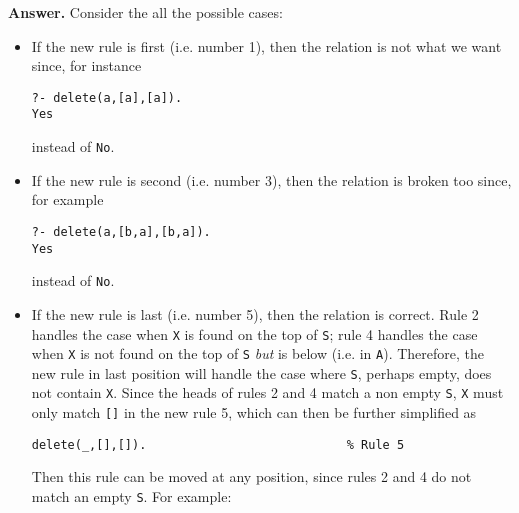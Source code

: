\noindent \textbf{Answer.} Consider the all the possible cases:
\begin{itemize}
 
  \item If the new rule is first (i.e. number 1), then the relation is
    not what we want since, for instance
{\small
\begin{verbatim}
?- delete(a,[a],[a]).
Yes
\end{verbatim}
}
\noindent instead of \texttt{No}.

  \item If the new rule is second (i.e. number 3), then the relation
    is broken too since, for example
{\small
\begin{verbatim}
?- delete(a,[b,a],[b,a]).
Yes
\end{verbatim}
}
\noindent instead of \texttt{No}.

  \item If the new rule is last (i.e. number 5), then the relation is
    correct. Rule 2 handles the case when \texttt{X} is found on the
    top of \texttt{S}; rule 4 handles the case when \texttt{X} is not
    found on the top of \texttt{S} \emph{but} is below (i.e. in
    \texttt{A}). Therefore, the new rule in last position will handle
    the case where \texttt{S}, perhaps empty, does not contain
    \texttt{X}. Since the heads of rules 2 and 4 match a non empty
    \texttt{S}, \texttt{X} must only match \verb|[]| in the new rule
    5, which can then be further simplified as 
{\small
\begin{verbatim}
delete(_,[],[]).                            % Rule 5
\end{verbatim}
}
\noindent Then this rule can be moved at any position, since rules 2
and 4 do not match an empty \texttt{S}. For example:
{\small}

\end{itemize}
